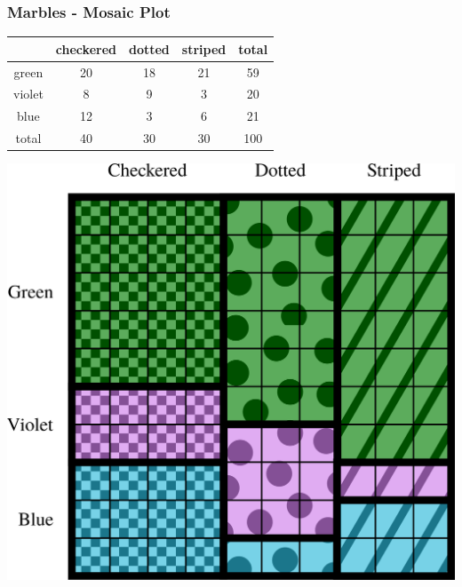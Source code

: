 \begin{frame}
\frametitle{Marbles - Mosaic Plot}

\tiny
\begin{tabular}{c|c c c | c}
       & checkered & dotted & striped & total \\ \hline
green  &  20       &  18    & 21 & 59 \\
violet & 8         &  9     & 3  & 20 \\
blue   & 12        & 3      & 6  & 21 \\ \hline
total  & 40        & 30     & 30 & 100 
\end{tabular}
\begin{center}
\includegraphics[scale=0.4]{1-7_categorical_data/figures/mosaic/mosaic5.png}
\end{center}


\end{frame}






